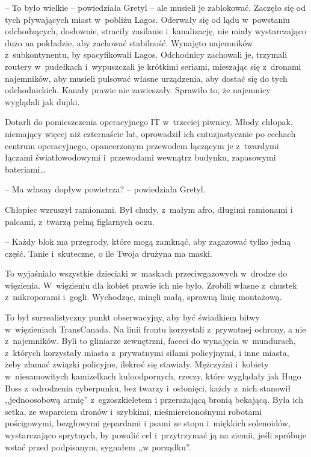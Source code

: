 \documentclass[oneside,polish,11pt,sfheadings]{mwbk}
\begin{document}
-- To było wielkie -- powiedziała Gretyl -- ale musieli je zablokować.
Zaczęło się od tych pływających miast w~pobliżu Lagos. Oderwały się od
lądu w~powstaniu odchodzących, dosłownie, straciły zasilanie i~kanalizację, nie miały wystarczająco dużo na pokładzie, aby zachować
stabilność. Wynajęto najemników z~subkontynentu, by spacyfikowali Lagos.
Odchodnicy zachowali je, trzymali routery w~pudełkach i~wypuszczali je
krótkimi seriami, mieszając się z~dronami najemników, aby musieli
pulsować własne urządzenia, aby dostać się do tych odchodnickich. Kanały
prawie nie zawieszały. Sprawiło to, że najemnicy wyglądali jak dupki.

Dotarli do pomieszczenia operacyjnego IT w~trzeciej piwnicy. Młody
chłopak, niemający więcej niż czternaście lat, oprowadził ich
entuzjastycznie po cechach centrum operacyjnego, opancerzonym przewodem
łączącym je z~twardymi łączami światłowodowymi i~przewodami wewnątrz
budynku, zapasowymi bateriami\ldots 

-- Ma własny dopływ powietrza? -- powiedziała Gretyl.

Chłopiec wzruszył ramionami. Był chudy, z~małym afro, długimi ramionami
i palcami, z~twarzą pełną figlarnych oczu. 

-- Każdy blok ma przegrody,
które mogą zamknąć, aby zagazować tylko jedną część. Tanie i~skuteczne,
o ile Twoja drużyna ma maski. 

To wyjaśniało wszystkie dzieciaki w~maskach przeciwgazowych w~drodze do więzienia. W~więzieniu dla kobiet
prawie ich nie było. Zrobili własne z~chustek z~mikroporami i~gogli.
Wychodząc, minęli małą, sprawną linię montażową.

To był surrealistyczny punkt obserwacyjny, aby być świadkiem bitwy w~więzieniach TransCanada. Na linii frontu korzystali z~prywatnej ochrony,
a nie z~najemników. Byli to gliniarze zewnętrzni, faceci do wynajęcia w~mundurach, z~których korzystały miasta z~prywatnymi siłami policyjnymi,
i inne miasta, żeby złamać związki policyjne, ilekroć się stawiały.
Mężczyźni i~kobiety w~niesamowitych kamizelkach kuloodpornych, rzeczy,
które wyglądały jak Hugo Boss z~odrodzenia cyberpunku, bez twarzy i~osłonięci, każdy z~nich stanowił ,,jednoosobową armię'' z~egzoszkieletem
i przerażającą bronią bekającą. Była ich setka, ze wsparciem dronów i~szybkimi, nieśmiercionośnymi robotami pościgowymi, bezgłowymi gepardami
i psami ze stopu i~miękkich solenoidów, wystarczająco sprytnych, by
powalić cel i~przytrzymać ją na ziemii, jeśli spróbuje wstać przed
podpisanym, sygnałem ,,w porządku''.
\end{document}
